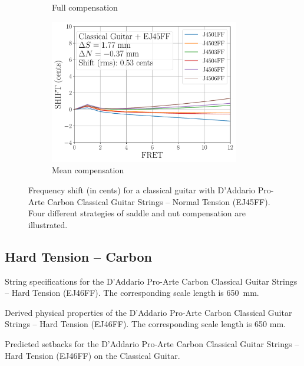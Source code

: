 \begin{figure}
\begin{subfigure}[b]{0.46\textwidth}
    \caption{Full compensation}
    \label{fig:shift_classicalguitar_ej45ff_full}
   \end{subfigure}
   \hspace{0.25in}
   \begin{subfigure}[b]{0.46\textwidth}
    \centering
    \includegraphics[width=3.25in]{figures/shift_classicalguitar_ej45ff_mean}
    \caption{Mean compensation}
    \label{fig:shift_classicalguitar_ej45ff_mean}
   \end{subfigure}
   \caption{\label{fig:compensation_classicalguitar_ej45ff} Frequency shift (in cents) for a classical guitar with D'Addario Pro-Arte Carbon Classical Guitar Strings -- Normal Tension (EJ45FF). Four different strategies of saddle and nut compensation are illustrated.}
 \end{figure}
 
 \newpage
 \subsection{Hard Tension -- Carbon}
 
 \begin{table}[htbp]
   \centering
   \caption{\label{tbl:ej46ff_mks} String specifications for the D'Addario Pro-Arte Carbon Classical Guitar Strings -- Hard Tension (EJ46FF). The corresponding scale length is 650~mm.}
   
 \end{table}%
 
 \begin{table}[htbp]
   \centering
   \caption{\label{tbl:ej46ff_props} Derived physical properties of the D'Addario Pro-Arte Carbon Classical Guitar Strings -- Hard Tension (EJ46FF). The corresponding scale length is 650 mm.}
   
 \end{table}%
 
 \begin{table}[htbp]
   \centering
   \caption{\label{tbl:ej46ff_setbacks} Predicted setbacks for the D'Addario Pro-Arte Carbon Classical Guitar Strings -- Hard Tension (EJ46FF) on the Classical Guitar.}
   
 \end{table}%
 
